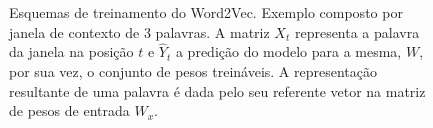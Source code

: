 \begin{figure}%
    \centering
    \qquad
    \caption{Esquemas de treinamento do Word2Vec. Exemplo composto por janela de
             contexto de 3 palavras. A matriz $X_t$ representa a palavra da
             janela na posição $t$ e $\hat{Y}_t$ a predição do modelo para a
             mesma, $W$, por sua vez, o conjunto de pesos treináveis.
             A representação resultante de uma palavra é dada pelo seu referente
             vetor na matriz de pesos de entrada $W_x$.}%
    \label{fig:w2v}%
\end{figure}

